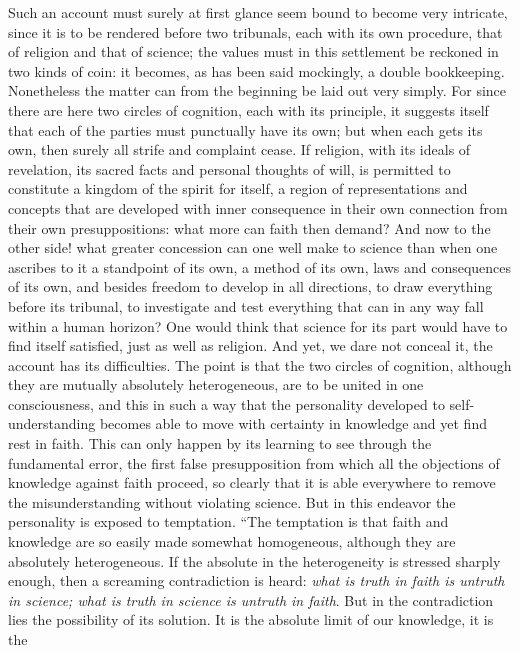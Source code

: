 \documentclass[12pt]{book}
\newcommand{\opage}[1]{\marginnote{\footnotesize\textit{[#1]}}}
\begin{document}
Such an account must surely at first glance seem bound to become very
intricate, since it is to be rendered before two tribunals, each with
its own procedure, that of religion and that of science; the values
must in this settlement be reckoned in two kinds of coin: it becomes, as
has been said mockingly, a double bookkeeping. Nonetheless the matter
can from the beginning be laid out very simply. For since there are
here two circles of cognition, each with its principle, it suggests
itself that each of the parties must punctually have its own; but when
\opage{226}\setcounter{footnote}{0}%
each gets its own, then surely all strife and complaint cease. If
religion, with its ideals of revelation, its sacred facts and personal
thoughts of will, is permitted to constitute a kingdom of the spirit
for itself, a region of representations and concepts that are developed
with inner consequence in their own connection from their own
presuppositions: what more can faith then demand? And now to the other
side! what greater concession can one well make to science than when
one ascribes to it a standpoint of its own, a method of its own, laws
and consequences of its own, and besides freedom to develop in all
directions, to draw everything before its tribunal, to investigate and
test everything that can in any way fall within a human horizon? One
would think that science for its part would have to find itself
satisfied, just as well as religion. And yet, we dare not conceal it,
the account has its difficulties. The point is that the two circles of
cognition, although they are mutually absolutely heterogeneous, are to
be united in one consciousness, and this in such a way that the
personality developed to self-understanding becomes able to move with
certainty in knowledge and yet find rest in faith. This can only happen
by its learning to see through the fundamental error, the first false
presupposition from which all the objections of knowledge against faith
proceed, so clearly that it is able everywhere to remove the
misunderstanding without violating science. But in this endeavor the
personality is exposed to temptation. ``The temptation is that faith
and knowledge are so easily made somewhat homogeneous, although they
are absolutely heterogeneous. If the absolute in the heterogeneity is
stressed sharply enough, then a screaming contradiction is heard:
\emph{what is truth in faith is untruth in science; what is truth in
science is untruth in faith}. But in the contradiction lies the
possibility
\opage{227}\setcounter{footnote}{0}%
of its solution. It is the absolute limit of our knowledge, it is the
\end{document}
